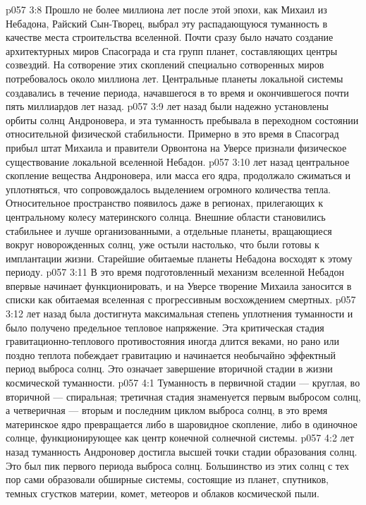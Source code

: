 \vs p057 3:8 Прошло не более миллиона лет после этой эпохи, как Михаил из Небадона, Райский Сын\hyp{}Творец, выбрал эту распадающуюся туманность в качестве места строительства вселенной. Почти сразу было начато создание архитектурных миров Спасограда и ста групп планет, составляющих центры созвездий. На сотворение этих скоплений специально сотворенных миров потребовалось около миллиона лет. Центральные планеты локальной системы создавались в течение периода, начавшегося в то время и окончившегося почти пять миллиардов лет назад.
\vs p057 3:9 \pc {} лет назад были надежно установлены орбиты солнц Андроновера, и эта туманность пребывала в переходном состоянии относительной физической стабильности. Примерно в это время в Спасоград прибыл штат Михаила и правители Орвонтона на Уверсе признали физическое существование локальной вселенной Небадон.
\vs p057 3:10 \pc {} лет назад центральное скопление вещества Андроновера, или масса его ядра, продолжало сжиматься и уплотняться, что сопровождалось выделением огромного количества тепла. Относительное пространство появилось даже в регионах, прилегающих к центральному колесу материнского солнца. Внешние области становились стабильнее и лучше организованными, а отдельные планеты, вращающиеся вокруг новорожденных солнц, уже остыли настолько, что были готовы к имплантации жизни. Старейшие обитаемые планеты Небадона восходят к этому периоду.
\vs p057 3:11 В это время подготовленный механизм вселенной Небадон впервые начинает функционировать, и на Уверсе творение Михаила заносится в списки как обитаемая вселенная с прогрессивным восхождением смертных.
\vs p057 3:12 \pc {} лет назад была достигнута максимальная степень уплотнения туманности и было получено предельное тепловое напряжение. Эта критическая стадия гравитационно\hyp{}теплового противостояния иногда длится веками, но рано или поздно теплота побеждает гравитацию и начинается необычайно эффектный период выброса солнц. Это означает завершение вторичной стадии в жизни космической туманности.
\vs p057 4:1 Туманность в первичной стадии --- круглая, во вторичной --- спиральная; третичная стадия знаменуется первым выбросом солнц, а четверичная --- вторым и последним циклом выброса солнц, в это время материнское ядро превращается либо в шаровидное скопление, либо в одиночное солнце, функционирующее как центр конечной солнечной системы.
\vs p057 4:2 \pc {} лет назад туманность Андроновер достигла высшей точки стадии образования солнц. Это был пик первого периода выброса солнц. Большинство из этих солнц с тех пор сами образовали обширные системы, состоящие из планет, спутников, темных сгустков материи, комет, метеоров и облаков космической пыли.
